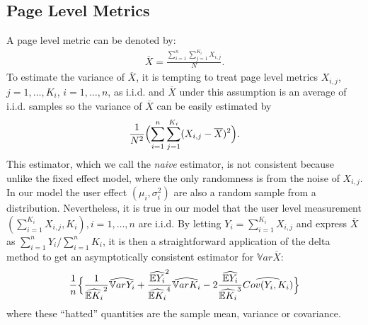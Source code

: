 \documentclass[10pt]{article}
\newcommand{\wht}{\widehat}
\newcommand{\var}{\ensuremath{\mathbb Var}}
\newcommand{\bbe}{\mathbb{E}}
\newcommand{\xbar}{\overline{X}}
\begin{document}
\subsection{Page Level Metrics}
A page level metric can be denoted by:
\begin{align*}
\xbar= \frac{\sum_{i=1}^n\sum_{j=1}^{K_i} X_{i,j}}{N}.
\end{align*}
To estimate the variance of $\xbar$, it is tempting to treat page level metrics $X_{i,j}$, $j=1,\dots,K_i$, $i=1,\dots,n$, as i.i.d. and $\xbar$ under this assumption is an average of i.i.d. samples so the variance of $\xbar$ can be easily estimated by
\begin{align*}
\frac{1}{N^2} \Bigl (\sum_{i=1}^n \sum_{j=1}^{K_i} (X_{i,j}-\overline{X})^2 \Bigr ).
\end{align*}
This estimator, which we call the \emph{naive} estimator,  is not consistent because unlike the fixed effect model, where the only randomness is from the noise of $X_{i,j}$. In our model the user effect $(\mu_i,\sigma_i^2)$ are also a random sample from a distribution. Nevertheless, it is true in our model that the user level measurement $(\sum_{i=1}^{K_i} X_{i,j}, K_i),i=1,\dots,n$ are i.i.d. By letting $Y_i = \sum_{i=1}^{K_i} X_{i,j}$ and express $\xbar$ as $\sum_{i=1}^n Y_i / \sum_{i=1}^n K_i$, it is then a straightforward application of the delta method to get an asymptotically consistent estimator for $\var \xbar$:
\begin{align*}
\frac{1}{n} \Bigl\{ \frac{1}{\wht{\bbe K_i}^2}\wht{\var Y_i} + \frac{\wht{\bbe Y_i}^2}{\wht{\bbe K_i}^4}\wht{\var K_i} - 2\frac{\wht{\bbe Y_i}}{\wht{\bbe K_i}^3} \wht{Cov(Y_i,K_i)} \Bigr\} 
\end{align*}
where these ``hatted'' quantities are the sample mean, variance or covariance. 
\end{document}
